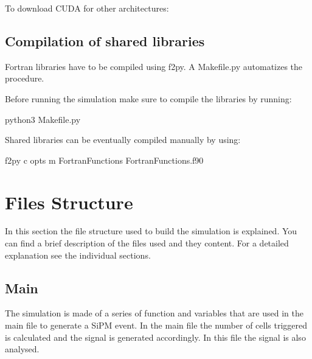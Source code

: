 \documentclass[letterpaper,10pt,english]{sphinxmanual}
\begin{document}
To download CUDA for other architectures: 


\section{Compilation of shared libraries}
\label{\detokenize{installation:compilation-of-shared-libraries}}
\begin{DUlineblock}{0em}
\item[] Fortran libraries have to be compiled using f2py. A Makefile.py automatizes the procedure.
\item[] Before running the simulation make sure to compile the libraries by running:
\end{DUlineblock}

\begin{sphinxVerbatim}[commandchars=\\\{\}]
python3 Makefile.py
\end{sphinxVerbatim}

Shared libraries can be eventually compiled manually by using:

\begin{sphinxVerbatim}[commandchars=\\\{\}]
f2py \PYGZhy{}c \PYGZhy{}\PYGZhy{}opts   \PYGZhy{}m FortranFunctions FortranFunctions.f90
\end{sphinxVerbatim}


\chapter{Files Structure}
\label{\detokenize{structure:files-structure}}\label{\detokenize{structure::doc}}
In this section the file structure used to build the simulation is explained. You can find a brief description of the files used and they content. For a detailed explanation see the individual sections.


\section{Main}
\label{\detokenize{structure:main}}
The simulation is made of a series of function and variables that are used in the main file to generate a SiPM event. In the main file the number of cells triggered is calculated and the signal is generated accordingly. In this file the signal is also analysed.
\end{document}
